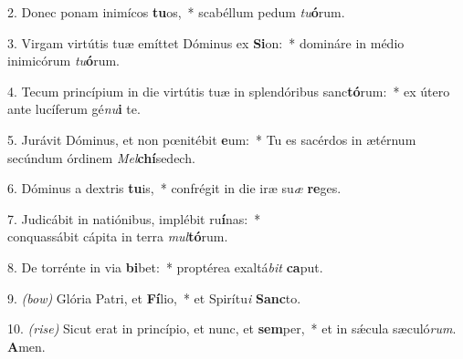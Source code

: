 2. Donec ponam inimícos \textbf{tu}os,~* scabéllum pedum \textit{tu}\textbf{ó}rum.

3. Virgam virtútis tuæ emíttet Dóminus ex \textbf{Si}on:~* domináre in médio inimicórum \textit{tu}\textbf{ó}rum.

4. Tecum princípium in die virtútis tuæ in splendóribus sanc\textbf{tó}rum:~* ex útero ante lucíferum gé\textit{nu}\textbf{i} te.

5. Jurávit Dóminus, et non p{\oe}nitébit \textbf{e}um:~* Tu es sacérdos in ætérnum secúndum órdinem \textit{Mel}\textbf{chí}sedech.

6. Dóminus a dextris \textbf{tu}is,~* confrégit in die iræ su\textit{æ} \textbf{re}ges.

7. Judicábit in natiónibus, implébit ru\textbf{í}nas:~*\\ conquassábit cápita in terra \textit{mul}\textbf{tó}rum.

8. De torrénte in via \textbf{bi}bet:~* proptérea exaltá\textit{bit} \textbf{ca}put.

9. {\color{red}\textit{(bow)}} Glória Patri, et \textbf{Fí}lio,~* et Spirítu\textit{i} \textbf{Sanc}to.

10. {\color{red}\textit{(rise)}} Sicut erat in princípio, et nunc, et \textbf{sem}per,~* et in s\'{\ae}cula sæculó\textit{rum}. \textbf{A}men.
